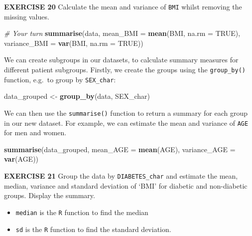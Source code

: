 \documentclass[
]{article}
\newenvironment{Shaded}{\begin{snugshade}}{\end{snugshade}}
\newcommand{\CommentTok}[1]{\textcolor[rgb]{0.56,0.35,0.01}{\textit{#1}}}
\newcommand{\DataTypeTok}[1]{\textcolor[rgb]{0.13,0.29,0.53}{#1}}
\newcommand{\KeywordTok}[1]{\textcolor[rgb]{0.13,0.29,0.53}{\textbf{#1}}}
\newcommand{\NormalTok}[1]{#1}
\newcommand{\OtherTok}[1]{\textcolor[rgb]{0.56,0.35,0.01}{#1}}
\newcommand{\StringTok}[1]{\textcolor[rgb]{0.31,0.60,0.02}{#1}}
\providecommand{\tightlist}{%
  \setlength{\itemsep}{0pt}\setlength{\parskip}{0pt}}
\begin{document}
\textbf{EXERCISE 20} Calculate the mean and variance of \texttt{BMI}
whilst removing the missing values.

\begin{Shaded}
\begin{Highlighting}[]
\CommentTok{# Your turn}
\KeywordTok{summarise}\NormalTok{(data, }\DataTypeTok{mean_BMI =} \KeywordTok{mean}\NormalTok{(BMI, }\DataTypeTok{na.rm =} \OtherTok{TRUE}\NormalTok{), }
          \DataTypeTok{variance_BMI =} \KeywordTok{var}\NormalTok{(BMI, }\DataTypeTok{na.rm =} \OtherTok{TRUE}\NormalTok{))}
\end{Highlighting}
\end{Shaded}

We can create subgroups in our datasets, to calculate summary measures
for different patient subgroups. Firstly, we create the groups using the
\texttt{group\_by()} function, e.g.~to group by \texttt{SEX\_char}:

\begin{Shaded}
\begin{Highlighting}[]
\NormalTok{data_grouped <-}\StringTok{ }\KeywordTok{group_by}\NormalTok{(data, SEX_char)}
\end{Highlighting}
\end{Shaded}

We can then use the \texttt{summarise()} function to return a summary
for each group in our new dataset. For example, we can estimate the mean
and variance of \texttt{AGE} for men and women.

\begin{Shaded}
\begin{Highlighting}[]
\KeywordTok{summarise}\NormalTok{(data_grouped, }\DataTypeTok{mean_AGE =} \KeywordTok{mean}\NormalTok{(AGE), }\DataTypeTok{variance_AGE =} \KeywordTok{var}\NormalTok{(AGE))}
\end{Highlighting}
\end{Shaded}

\textbf{EXERCISE 21} Group the data by \texttt{DIABETES\_char} and
estimate the mean, median, variance and standard deviation of `BMI' for
diabetic and non-diabetic groups. Display the summary.

\begin{itemize}
\tightlist
\item
  \texttt{median} is the \texttt{R} function to find the median
\item
  \texttt{sd} is the \texttt{R} function to find the standard deviation.
\end{itemize}
\end{document}
